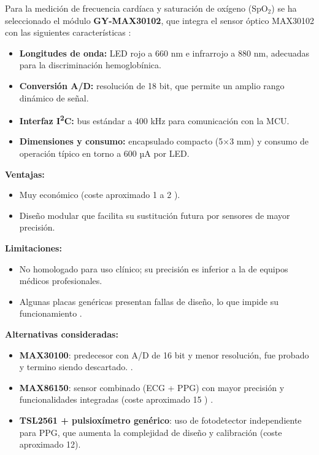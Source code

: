 \documentclass[12pt, a4paper]{article}
\begin{document}
	Para la medición de frecuencia cardíaca y saturación de oxígeno (SpO$_2$) se ha seleccionado el módulo \textbf{GY-MAX30102}, que integra el sensor óptico MAX30102 con las siguientes características \cite{MAX30102Datasheet}:
	\begin{itemize}
		\item \textbf{Longitudes de onda:} LED rojo a 660 nm e infrarrojo a 880 nm, adecuadas para la discriminación hemoglobínica.
		\item \textbf{Conversión A/D:} resolución de 18 bit, que permite un amplio rango dinámico de señal.
		\item \textbf{Interfaz I\textsuperscript{2}C:} bus estándar a 400 kHz para comunicación con la MCU.
		\item \textbf{Dimensiones y consumo:} encapsulado compacto (5×3 mm) y consumo de operación típico en torno a 600 µA por LED.
	\end{itemize}
	
	\noindent\textbf{Ventajas:}
	\begin{itemize}
		\item Muy económico (coste aproximado 1 a 2 \texteuro{}).
		\item Diseño modular que facilita su sustitución futura por sensores de mayor precisión.
	\end{itemize}
	
	\noindent\textbf{Limitaciones:}
	\begin{itemize}
		\item No homologado para uso clínico; su precisión es inferior a la de equipos médicos profesionales.  
		\item Algunas placas genéricas presentan fallas de diseño, lo que impide su funcionamiento \cite{LuisLlamas2021}.
	\end{itemize}
	
	\noindent\textbf{Alternativas consideradas:}
	\begin{itemize}
		\item \textbf{MAX30100}: predecesor con A/D de 16 bit y menor resolución, fue probado y termino siendo descartado. \cite{MAX30100Datasheet}.
		\item \textbf{MAX86150}: sensor combinado (ECG + PPG) con mayor precisión y funcionalidades integradas (coste aproximado 15 \texteuro{}) \cite{MAX86150Datasheet}.
		\item \textbf{TSL2561 + pulsioxímetro genérico}: uso de fotodetector independiente para PPG, que aumenta la complejidad de diseño y calibración (coste aproximado 12\texteuro{}).
	\end{itemize}
		
\end{document}
